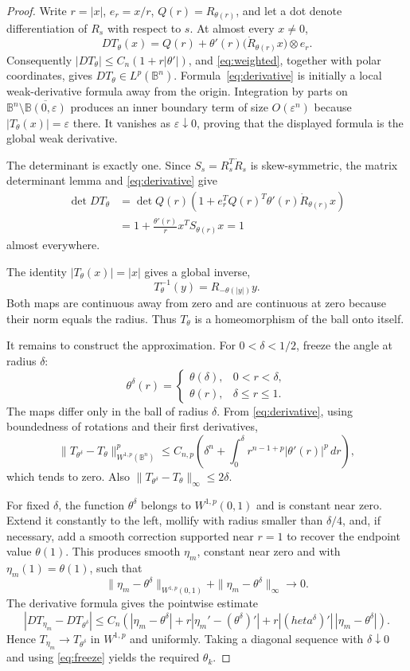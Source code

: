\documentclass[11pt]{article}
\theoremstyle{remark}
\newcommand{\B}{\mathbb{B}}
\begin{document}
\begin{proof}
Write $r=|x|$, $e_r=x/r$, $Q(r)=R_{\theta(r)}$, and let a dot denote
differentiation of $R_s$ with respect to $s$.  At almost every $x\ne0$,
\[
 DT_\theta(x)
 =Q(r)+\theta'(r)\bigl(\dot R_{\theta(r)}x\bigr)\otimes e_r.
 \tag{4.2}\label{eq:derivative}
\]
Consequently $|DT_\theta|\leq C_n(1+r|\theta'|)$, and
\eqref{eq:weighted}, together with polar coordinates, gives
$DT_\theta\in L^p(\B^n)$.  Formula~\eqref{eq:derivative} is initially a
local weak-derivative formula away from the origin.  Integration by parts on
$\B^n\setminus\overline{\B(0,\varepsilon)}$ produces an inner boundary
term of size $O(\varepsilon^n)$ because $|T_\theta(x)|=\varepsilon$ there.
It vanishes as $\varepsilon\downarrow0$, proving that the displayed formula
is the global weak derivative.

The determinant is exactly one.  Since
$S_s=R_s^T\dot R_s$ is skew-symmetric, the matrix determinant lemma and
\eqref{eq:derivative} give
\[
 \begin{aligned}
 \det DT_\theta
 &=\det Q(r)\left(1+
 e_r^T Q(r)^T\theta'(r)\dot R_{\theta(r)}x\right)\\
 &=1+\frac{\theta'(r)}{r}x^TS_{\theta(r)}x=1
 \end{aligned}
\]
almost everywhere.

The identity $|T_\theta(x)|=|x|$ gives a global inverse,
\[
 T_\theta^{-1}(y)=R_{-\theta(|y|)}y.
\]
Both maps are continuous away from zero and are continuous at zero because
their norm equals the radius.  Thus $T_\theta$ is a homeomorphism of the ball
onto itself.

It remains to construct the approximation.  For $0<\delta<1/2$, freeze the
angle at radius $\delta$:
\[
 \theta^\delta(r)=
 \begin{cases}
 \theta(\delta),&0<r<\delta,\\
 \theta(r),&\delta\leq r\leq1.
 \end{cases}
\]
The maps differ only in the ball of radius $\delta$.  From
\eqref{eq:derivative}, using boundedness of rotations and their first
derivatives,
\[
 \|T_{\theta^\delta}-T_\theta\|_{W^{1,p}(\B^n)}^p
 \leq C_{n,p}\left(
 \delta^n+\int_0^\delta r^{n-1+p}|\theta'(r)|^p\,dr\right),
 \tag{4.3}\label{eq:freeze}
\]
which tends to zero.  Also
$\|T_{\theta^\delta}-T_\theta\|_\infty\leq2\delta$.

For fixed $\delta$, the function $\theta^\delta$ belongs to
$W^{1,p}(0,1)$ and is constant near zero.  Extend it constantly to the left,
mollify with radius smaller than $\delta/4$, and, if necessary, add a smooth
correction supported near $r=1$ to recover the endpoint value
$\theta(1)$.  This produces smooth $\eta_m$, constant near zero and with
$\eta_m(1)=\theta(1)$, such that
\[
 \|\eta_m-\theta^\delta\|_{W^{1,p}(0,1)}
 +\|\eta_m-\theta^\delta\|_\infty\longrightarrow0.
\]
The derivative formula gives the pointwise estimate
\[
 |DT_{\eta_m}-DT_{\theta^\delta}|
 \leq C_n\left(
 |\eta_m-\theta^\delta|+r|\eta_m'-(\theta^\delta)'|
 +r|(	heta^\delta)'|\,|\eta_m-\theta^\delta|
 \right).
\]
Hence $T_{\eta_m}\to T_{\theta^\delta}$ in $W^{1,p}$ and uniformly.
Taking a diagonal sequence with $\delta\downarrow0$ and using
\eqref{eq:freeze} yields the required $\theta_k$.


\end{proof}
\end{document}
